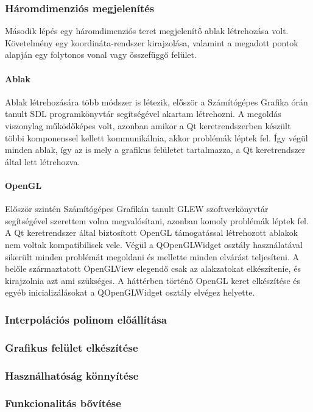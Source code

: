 \documentclass[12pt]{report}
\begin{document}
\subsubsection{Háromdimenziós megjelenítés}
Második lépés egy háromdimenziós teret megjelenítő ablak létrehozása volt. Követelmény egy koordináta-rendszer kirajzolása, valamint a megadott pontok alapján egy folytonos vonal vagy összefüggő felület.

\paragraph{Ablak}
Ablak létrehozására több módszer is létezik, először a Számítógépes Grafika órán tanult SDL programkönyvtár segítségével akartam létrehozni. A megoldás viszonylag működőképes volt, azonban amikor a Qt keretrendszerben készült többi komponenssel kellett kommunikálnia, akkor problémák léptek fel. Így végül minden ablak, így az is mely a grafikus felületet tartalmazza, a Qt keretrendszer által lett létrehozva.

\paragraph{OpenGL}
Először szintén Számítógépes Grafikán tanult GLEW szoftverkönyvtár segítségével szerettem volna megvalósítani, azonban komoly problémák léptek fel. A Qt keretrendszer által biztosított OpenGL támogatással létrehozott ablakok nem voltak kompatibilisek vele. Végül a QOpenGLWidget osztály használatával sikerült minden problémát megoldani és mellette minden elvárást teljesíteni. A belőle származtatott OpenGLView elegendő csak az alakzatokat elkészítenie, és kirajzolnia azt ami szükséges. A háttérben történő OpenGL keret elkészítése és egyéb inicializálásokat a QOpenGLWidget osztály elvégez helyette.

\subsubsection{Interpolációs polinom előállítása}
\subsubsection{Grafikus felület elkészítése}
\subsubsection{Használhatóság könnyítése}
\subsubsection{Funkcionalitás bővítése}
\end{document}
